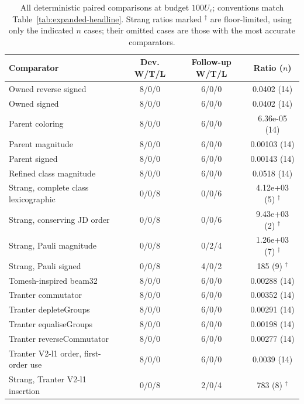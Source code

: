 \begin{table}[htbp]
\centering
\small
\caption{All deterministic paired comparisons at budget $100U_c$; conventions match Table~\ref{tab:expanded-headline}. Strang ratios marked $^{\dagger}$ are floor-limited, using only the indicated $n$ cases; their omitted cases are those with the most accurate comparators.}
\label{tab:expanded-all-1}
\begin{tabular}{p{}ccc}
\toprule
Comparator & Dev. W/T/L & Follow-up W/T/L & Ratio ($n$)\\
\midrule
Owned reverse signed & 8/0/0 & 6/0/0 & 0.0402 (14)\\
Owned signed & 8/0/0 & 6/0/0 & 0.0402 (14)\\
Parent coloring & 8/0/0 & 6/0/0 & 6.36e-05 (14)\\
Parent magnitude & 8/0/0 & 6/0/0 & 0.00103 (14)\\
Parent signed & 8/0/0 & 6/0/0 & 0.00143 (14)\\
Refined class magnitude & 8/0/0 & 6/0/0 & 0.0518 (14)\\
Strang, complete class lexicographic & 0/0/8 & 0/0/6 & 4.12e+03 (5) $^{\dagger}$\\
Strang, conserving JD order & 0/0/8 & 0/0/6 & 9.43e+03 (2) $^{\dagger}$\\
Strang, Pauli magnitude & 0/0/8 & 0/2/4 & 1.26e+03 (7) $^{\dagger}$\\
Strang, Pauli signed & 0/0/8 & 4/0/2 & 185 (9) $^{\dagger}$\\
Tomesh-inspired beam32 & 8/0/0 & 6/0/0 & 0.00288 (14)\\
Tranter commutator & 8/0/0 & 6/0/0 & 0.00352 (14)\\
Tranter depleteGroups & 8/0/0 & 6/0/0 & 0.00291 (14)\\
Tranter equaliseGroups & 8/0/0 & 6/0/0 & 0.00198 (14)\\
Tranter reverseCommutator & 8/0/0 & 6/0/0 & 0.00277 (14)\\
Tranter V2-l1 order, first-order use & 8/0/0 & 6/0/0 & 0.0039 (14)\\
Strang, Tranter V2-l1 insertion & 0/0/8 & 2/0/4 & 783 (8) $^{\dagger}$\\
\bottomrule
\end{tabular}
\end{table}
